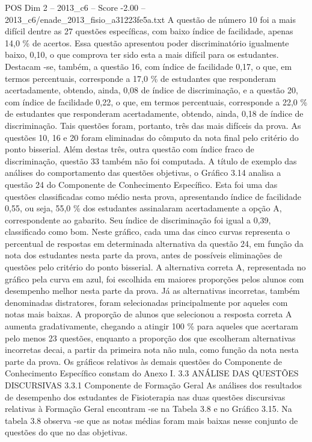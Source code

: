 \begin{textsample}{POS Dim 2 – 2013\_c6 – Score -2.00 – 2013\_c6/enade\_2013\_fisio\_a31223fe5a.txt}
A questão de número 10 foi a mais difícil dentre as 27 questões específicas, com baixo índice de facilidade, apenas 14,0 \% de acertos.
Essa questão apresentou poder discriminatório igualmente baixo, 0,10, o que comprova ter sido esta a mais difícil para os estudantes.
Destacam -se, também, a questão 16, com índice de facilidade 0,17, o que, em termos percentuais, corresponde a 17,0 \% de estudantes que responderam acertadamente, obtendo, ainda, 0,08 de índice de discriminação, e a questão 20, com índice de facilidade 0,22, o que, em termos percentuais, corresponde a 22,0 \% de estudantes que responderam acertadamente, obtendo, ainda, 0,18 de índice de discriminação.
Tais questões foram, portanto, três das mais difíceis da prova.
As questões 10, 16 e 20 foram eliminadas do cômputo da nota final pelo critério do ponto bisserial.
Além destas três, outra questão com índice fraco de discriminação, questão 33 também não foi computada.
A título de exemplo das análises do comportamento das questões objetivas, o Gráfico 3.14 analisa a questão 24 do Componente de Conhecimento Específico.
Esta foi uma das questões classificadas como médio nesta prova, apresentando índice de facilidade 0,55, ou seja, 55,0 \% dos estudantes assinalaram acertadamente a opção A, correspondente ao gabarito.
Seu índice de discriminação foi igual a 0,39, classificado como bom.
Neste gráfico, cada uma das cinco curvas representa o percentual de respostas em determinada alternativa da questão 24, em função da nota dos estudantes nesta parte da prova, antes de possíveis eliminações de questões pelo critério do ponto bisserial.
A alternativa correta A, representada no gráfico pela curva em azul, foi escolhida em maiores proporções pelos alunos com desempenho melhor nesta parte da prova.
Já as alternativas incorretas, também denominadas distratores, foram selecionadas principalmente por aqueles com notas mais baixas.
A proporção de alunos que selecionou a resposta correta A aumenta gradativamente, chegando a atingir 100 \% para aqueles que acertaram pelo menos 23 questões, enquanto a proporção dos que escolheram alternativas incorretas decai, a partir da primeira nota não nula, como função da nota nesta parte da prova.
Os gráficos relativos às demais questões do Componente de Conhecimento Específico constam do Anexo I. 3.3 ANÁLISE DAS QUESTÕES DISCURSIVAS 3.3.1 Componente de Formação Geral As análises dos resultados de desempenho dos estudantes de Fisioterapia nas duas questões discursivas relativas à Formação Geral encontram -se na Tabela 3.8 e no Gráfico 3.15.
Na tabela 3.8 observa -se que as notas médias foram mais baixas nesse conjunto de questões do que no das objetivas.

\end{textsample}
